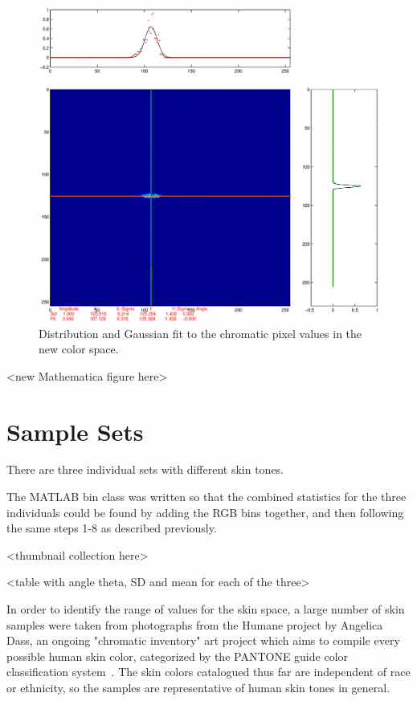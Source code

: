 \begin{figure}[h!]
  \centering
    \includegraphics[width=\textwidth]{Chapter3/Figs/crosshairFigureFinal.eps}
    \caption{Distribution and Gaussian fit to the chromatic pixel values in the new color space.}  \label{fig:DistributionAndGaussianFit}
\end{figure}

<new Mathematica figure here>

\section{Sample Sets}\label{sec:SampleSets}
There are three individual sets with different skin tones.



The MATLAB bin class was written so that the combined statistics for the three individuals could be found by adding the RGB bins together, and then following the same steps 1-8 as described previously.

<thumbnail collection here>

<table with angle theta, SD and mean for each of the three>



In order to identify the range of values for the skin space, a large number of skin samples were taken from photographs from the Humane project by Angelica Dass, an ongoing "chromatic inventory" art project which aims to compile every possible human skin color, categorized by the PANTONE guide color classification system~\cite{Dass2012}. The skin colors catalogued thus far are independent of race or ethnicity, so the samples are representative of human skin tones in general.

